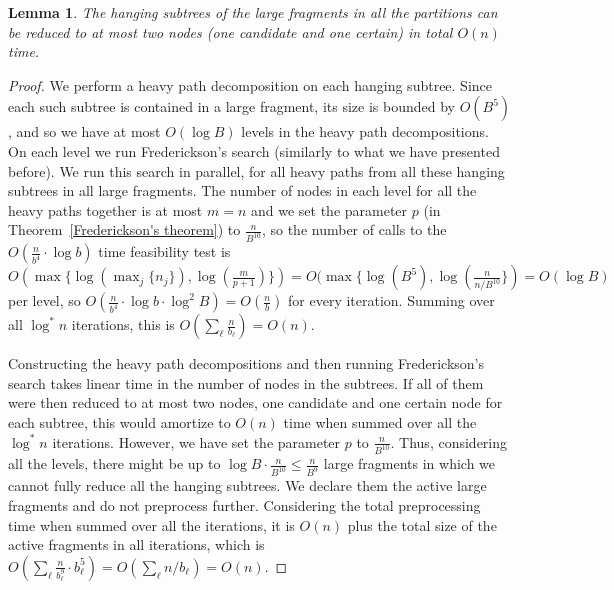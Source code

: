 \documentclass[11pt,a4paper]{article}
\newtheorem{lemma}{Lemma}
\theoremstyle{definition}
\theoremstyle{remark}
\begin{document}
\begin{lemma}\label{lemma1}
The hanging subtrees of the large fragments in all the partitions can be reduced to at most two nodes (one candidate and one certain) in total $O(n)$ time. 
\end{lemma}
\begin{proof}
We perform a heavy path decomposition on each hanging subtree. Since each such subtree is contained in a large fragment, its 
size is bounded by $O(B^5)$, and so we have at most $O(\log B)$ levels in the heavy 
path decompositions. On each level we run Frederickson's search (similarly to what we have presented before).
We run this search in parallel, for all heavy paths from all these hanging subtrees in all large fragments.
The number of  nodes in each level for all the heavy paths together is at most $m=n$ and we set
the parameter $p$ (in Theorem~\ref{Frederickson's theorem}) to $\frac{n}{B^{10}}$, so the number of calls to the $O(\frac{n}{b^4} \cdot \log b)$ time feasibility test
is $O(\max \lbrace \log(\max_{j} \lbrace n_j \rbrace), \log(\frac{m}{p+1}) \rbrace) = O(\max \lbrace \log (B^{5}), \log(\frac{n}{n/B^{10}} \rbrace) = O(\log B)$ per level, so
$O(\frac{n}{b^4} \cdot \log b \cdot \log^{2} B) = O(\frac{n}{b})$ for every iteration.
Summing over all $\log^{*}n$ iterations, this is $O(\sum_{\ell}\frac{n}{b_\ell}) = O(n)$.

Constructing the heavy path decompositions and then running Frederickson's search takes linear time in the number
of nodes in the subtrees. If all of them were then reduced to at most two nodes, one candidate and one certain
node for each subtree, this would amortize to $O(n)$ time when summed over all the $\log^{*}n$  iterations. However, we have set
the parameter $p$ to $\frac{n}{B^{10}}$. Thus, considering all the levels, there
might be up to $\log B\cdot\frac{n}{B^{10}}\leq \frac{n}{B^{9}}$ large fragments in which we cannot fully reduce
all the hanging subtrees. We declare them the active large fragments and do not preprocess further.
Considering the total preprocessing time when summed over all the iterations, it is $O(n)$
plus the total size of the active fragments in all iterations, which is $O(\sum_{\ell} \frac{n}{b_{\ell}^{9}}\cdot b_{\ell}^{5})=O(\sum_{\ell} n/b_{\ell})=O(n)$.
\end{proof}
\end{document}
